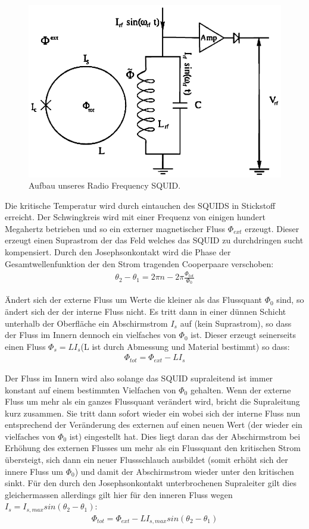 \documentclass[12pt]{article}
\begin{document}
\begin{figure}[H]
\centering
\includegraphics[width=0.9\linewidth]{pictures/rfSQUID.eps}
\caption{Aufbau unseres Radio Frequency SQUID.}
\end{figure}

Die  kritische Temperatur wird durch eintauchen des SQUIDS in Stickstoff erreicht. Der Schwingkreis wird mit einer Frequenz von einigen hundert Megahertz betrieben und so ein externer magnetischer Fluss $\Phi_{ext}$ erzeugt. Dieser erzeugt einen Suprastrom der das Feld welches das SQUID zu durchdringen sucht kompensiert. Durch den Josephsonkontakt wird die Phase der Gesamtwellenfunktion der den Strom tragenden Cooperpaare verschoben:
\begin{align}
 \theta_2-\theta_1=2\pi n - 2 \pi \frac{\Phi_{tot}}{\Phi_0}
\end{align}

Ändert sich der externe Fluss um Werte die kleiner als das Flussquant $\Phi_0$ sind,  so ändert sich der der interne Fluss nicht. Es tritt dann in einer dünnen Schicht unterhalb der Oberfläche ein Abschirmstrom $I_s$ auf (kein Suprastrom), so
dass der Fluss im Innern dennoch ein vielfaches von  $\Phi_0$ ist. Dieser erzeugt seinerseits einen Fluss $\Phi_s=L I_s$(L ist durch Abmessung und Material bestimmt) so dass:
\begin{align}
 \Phi_{tot}=\Phi_{ext}-L I_s
\end{align}

Der Fluss im Innern wird also solange das SQUID supraleitend ist immer konstant auf einem bestimmten Vielfachen von $\Phi_0$ gehalten. Wenn der externe Fluss um mehr als ein ganzes Flussquant verändert wird, bricht die Supraleitung kurz zusammen. Sie tritt dann sofort wieder ein wobei sich der interne Fluss nun entsprechend der Veränderung des externen auf einen neuen Wert (der wieder ein vielfaches von  $\Phi_0$ ist) eingestellt hat. Dies liegt  daran das der Abschirmstrom bei Erhöhung des externen Flusses um mehr als ein Flussquant den kritischen Strom übersteigt, sich dann ein neuer Flussschlauch ausbildet (somit erhöht sich der innere Fluss um $\Phi_0$) und damit der Abschirmstrom wieder unter den kritischen sinkt.
Für den durch den Josephsonkontakt unterbrochenen Supraleiter gilt dies gleichermassen allerdings gilt hier für den inneren Fluss wegen $I_s=I_{s,max} sin(\theta_2-\theta_1)$:
\begin{align}
 \Phi_{tot}=\Phi_{ext}-L I_{s,max} sin(\theta_2-\theta_1)
\end{align}
\end{document}
